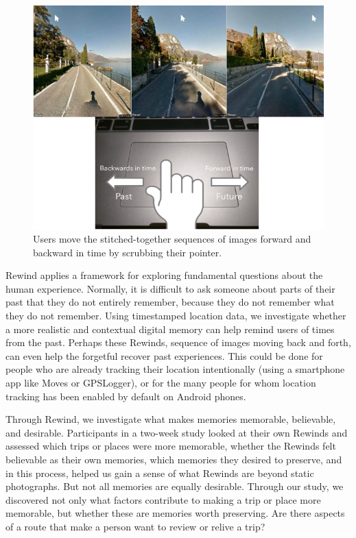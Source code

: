 \documentclass{sigchi}
\begin{document}
\begin{figure}
   \centering
     \includegraphics[width=1\linewidth]{scroll}
     \caption{Users move the stitched-together sequences of images forward and backward in time by scrubbing their pointer.}
     \label{fig:scrubbing}
\end{figure}

Rewind applies a framework for exploring fundamental questions about the human experience. Normally, it is difficult to ask someone about parts of their past that they do not entirely remember, because they do not remember what they do not remember.
Using timestamped location data, we investigate whether a more realistic and contextual digital memory can help remind users of times from the past. Perhaps these Rewinds, sequence of images moving back and forth, can even help the forgetful recover past experiences. This could be done for people who are already tracking their location intentionally (using a smartphone app like Moves or GPSLogger), or for the many people for whom location tracking has been enabled by default on Android phones.

Through Rewind, we investigate what makes memories memorable, believable, and desirable. Participants in a two-week study looked at their own Rewinds and assessed which trips or places were more memorable, whether the Rewinds felt believable as their own memories, which memories they desired to preserve, and in this process, helped us gain a sense of what Rewinds are beyond static photographs. But not all memories are equally desirable. Through our study, we discovered not only what factors contribute to making a trip or place more memorable, but whether these are memories worth preserving. Are there aspects of a route that make a person want to review or relive a trip?
 
\end{document}
